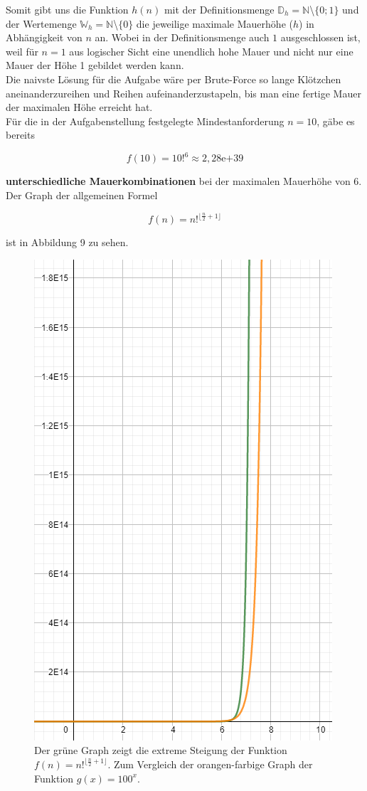 \documentclass[a4paper,12pt]{article}
\begin{document}
Somit gibt uns die Funktion $h(n)$ mit der Definitionsmenge $\mathbb{D}_{h} = \mathbb{N}$\textbackslash$\{0;1\}$ und der Wertemenge $\mathbb{W}_{h} = \mathbb{N}$\textbackslash$\{0\}$ die jeweilige maximale Mauerhöhe ($h$) in Abhängigkeit von $n$ an. Wobei in der Definitionsmenge auch $1$ ausgeschlossen ist, weil für $n = 1$ aus logischer Sicht eine unendlich hohe Mauer und nicht nur eine Mauer der Höhe 1 gebildet werden kann.
\\[0.4cm]
Die naivste Lösung für die Aufgabe wäre per Brute-Force so lange Klötzchen aneinanderzureihen und Reihen aufeinanderzustapeln, bis man eine fertige Mauer der maximalen Höhe erreicht hat.
\\[0.4cm]
Für die in der Aufgabenstellung festgelegte Mindestanforderung $n = 10$, gäbe es bereits
\begin{center}
\begin{Large}
\[f(10) = 10!^6\approx2,28\mathrm{e}{+39}\]
\end{Large}
\end{center}
\textbf{unterschiedliche Mauerkombinationen} bei der maximalen Mauerhöhe von 6.
Der Graph der allgemeinen Formel
\begin{center}
\begin{Large}
\[f(n) = n!^{\lfloor\frac{n}{2}+1\rfloor}\]
\end{Large}
\end{center}
ist in Abbildung 9 zu sehen.
\begin{figure}[H]
    \centering
    \includegraphics[width=0.8\linewidth]{Bilder/Aufgabe1/Graph_03.png}
    \caption{Der grüne Graph zeigt die extreme Steigung der Funktion 
        $f(n) = n!^{\lfloor\frac{n}{2}+1\rfloor}$. Zum Vergleich der orangen-farbige Graph der Funktion $g(x) = 100^{x}$.}
\end{figure}
\end{document}
